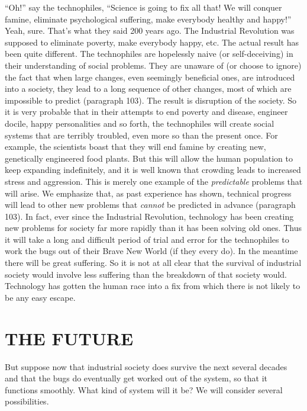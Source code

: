  “Oh!” say the technophiles, “Science is going to fix all that! We will conquer famine, eliminate psychological suffering, make everybody healthy and happy!” Yeah, sure. That’s what they said 200 years ago. The Industrial Revolution was supposed to eliminate poverty, make everybody happy, etc. The actual result has been quite different. The technophiles are hopelessly naive (or self-deceiving) in their understanding of social problems. They are unaware of (or choose to ignore) the fact that when large changes, even seemingly beneficial ones, are introduced into a society, they lead to a long sequence of other changes, most of which are impossible to predict (paragraph 103). The result is disruption of the society. So it is very probable that in their attempts to end poverty and disease, engineer docile, happy personalities and so forth, the technophiles will create social systems that are terribly troubled, even more so than the present once. For example, the scientists boast that they will end famine by creating new, genetically engineered food plants. But this will allow the human population to keep expanding indefinitely, and it is well known that crowding leads to increased stress and aggression. This is merely one example of the {\em predictable} problems that will arise. We emphasize that, as past experience has shown, technical progress will lead to other new problems that {\em cannot} be predicted in advance (paragraph 103). In fact, ever since the Industrial Revolution, technology has been creating new problems for society far more rapidly than it has been solving old ones. Thus it will take a long and difficult period of trial and error for the technophiles to work the bugs out of their Brave New World (if they every do). In the meantime there will be great suffering. So it is not at all clear that the survival of industrial society would involve less suffering than the breakdown of that society would. Technology has gotten the human race into a fix from which there is not likely to be any easy escape.

\chapter{THE FUTURE}

 But suppose now that industrial society does survive the next several decades and that the bugs do eventually get worked out of the system, so that it functions smoothly. What kind of system will it be? We will consider several possibilities.

